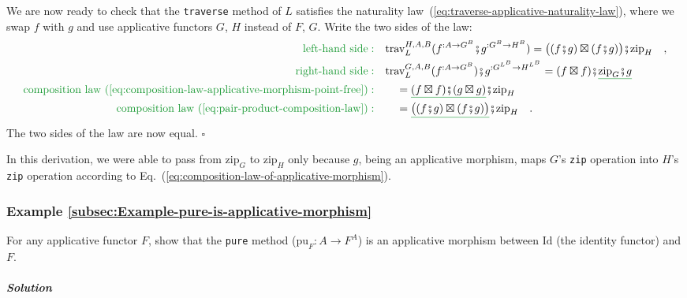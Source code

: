 We are now ready to check that the \lstinline!traverse! method of
$L$ satisfies the naturality law~(\ref{eq:traverse-applicative-naturality-law}),
where we swap $f$ with $g$ and use applicative functors $G$, $H$
instead of $F$, $G$. Write the two sides of the law:
\begin{align*}
{\color{greenunder}\text{left-hand side}:}\quad & \text{trav}_{L}^{H,A,B}(f^{:A\rightarrow G^{B}}\bef g^{:G^{B}\rightarrow H^{B}})=\big((f\bef g)\boxtimes(f\bef g)\big)\bef\text{zip}_{H}\quad,\\
{\color{greenunder}\text{right-hand side}:}\quad & \text{trav}_{L}^{G,A,B}(f^{:A\rightarrow G^{B}})\bef g^{:G^{L^{B}}\rightarrow H^{L^{B}}}=(f\boxtimes f)\bef\gunderline{\text{zip}_{G}\bef g}\\
{\color{greenunder}\text{composition law~(\ref{eq:composition-law-applicative-morphism-point-free})}:}\quad & \quad=\gunderline{(f\boxtimes f)\bef(g\boxtimes g)}\bef\text{zip}_{H}\\
{\color{greenunder}\text{composition law~(\ref{eq:pair-product-composition-law})}:}\quad & \quad=\gunderline{\big((f\bef g)\boxtimes(f\bef g)\big)}\bef\text{zip}_{H}\quad.
\end{align*}
The two sides of the law are now equal. $\square$

In this derivation, we were able to pass from $\text{zip}_{G}$ to
$\text{zip}_{H}$ only because $g$, being an applicative morphism,
maps $G$\textsf{'}s \lstinline!zip! operation into $H$\textsf{'}s \lstinline!zip!
operation according to Eq.~(\ref{eq:composition-law-of-applicative-morphism}).

\subsubsection{Example \label{subsec:Example-pure-is-applicative-morphism}\ref{subsec:Example-pure-is-applicative-morphism}}

For any applicative functor $F$, show that the \lstinline!pure!
method ($\text{pu}_{F}:A\rightarrow F^{A}$) is an applicative morphism
between $\text{Id}$ (the identity functor) and $F$.

\subparagraph{Solution}


